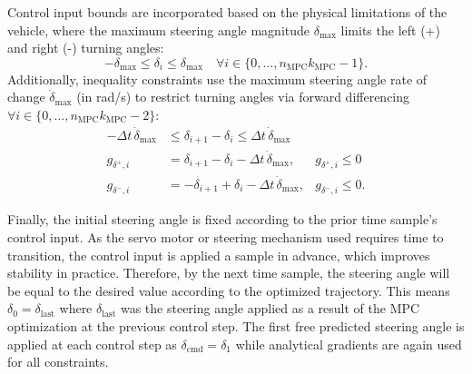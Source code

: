 \documentclass[journal]{IEEEtran}
\begin{document}
Control input bounds are incorporated based on the physical limitations of the vehicle, where the maximum steering angle magnitude $\delta_\text{max}$ limits the left (+) and right (-) turning angles:
\begin{equation}
    -\delta_\text{max}\leq\delta_i\leq\delta_\text{max} \quad \forall i\in \{0,...,n_\text{MPC}k_\text{MPC}-1\}.
    \label{steer_con1}
\end{equation}
Additionally, inequality constraints use the maximum steering angle rate of change $\dot\delta_\text{max}$ (in rad/s) to restrict turning angles via forward differencing $\forall i\in \{0,...,n_\text{MPC}k_\text{MPC}-2\}$:
\begin{subequations}
\label{steer_con2}
\begin{align}
    -\Delta t\,\dot\delta_\text{max}&\leq \delta_{i+1}-\delta_i \leq\Delta t\,\dot\delta_\text{max}\nonumber \\
    g_{\delta^+,i}&=\delta_{i+1}-\delta_i -\Delta t\,\dot\delta_\text{max}, &g_{\delta^+,i}\leq0\; \label{3.1.25} \\
    g_{\delta^-,i}&=-\delta_{i+1}+\delta_i -\Delta t\,\dot\delta_\text{max}, &g_{\delta^-,i}\leq0. \label{3.1.26}
\end{align}
\end{subequations}

Finally, the initial steering angle is fixed according to the prior time sample's control input. As the servo motor or steering mechanism used requires time to transition, the control input is applied a sample in advance, which improves stability in practice. Therefore, by the next time sample, the steering angle will be equal to the desired value according to the optimized trajectory. This means $\delta_0=\delta_\text{last}$ where $\delta_\text{last}$ was the steering angle applied as a result of the MPC optimization at the previous control step. The first free predicted steering angle is applied at each control step as $\delta_\text{cmd}=\delta_1$ while analytical gradients are again used for all constraints.
\end{document}
